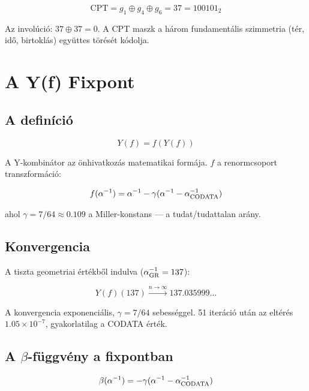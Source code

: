 \documentclass[11pt,a4paper,twoside]{book}
\begin{document}
\begin{equation}
\text{CPT} = g_1 \oplus g_4 \oplus g_6 = 37 = 100101_2
\end{equation}

Az involúció: $37 \oplus 37 = 0$. A CPT maszk a három fundamentális szimmetria (tér, idő, birtoklás) együttes törését kódolja.

\chapter{A Y(f) Fixpont}

\section{A definíció}

\begin{equation}
Y(f) = f(Y(f))
\end{equation}

A Y-kombinátor az önhivatkozás matematikai formája. $f$ a renormcsoport transzformáció:

\begin{equation}
f(\alpha^{-1}) = \alpha^{-1} - \gamma(\alpha^{-1} - \alpha^{-1}_{\rm CODATA})
\end{equation}

ahol $\gamma = 7/64 \approx 0.109$ a Miller-konstans — a tudat/tudattalan arány.

\section{Konvergencia}

A tiszta geometriai értékből indulva ($\alpha^{-1}_{\rm GR} = 137$):

\begin{equation}
Y(f)(137) \xrightarrow{n \to \infty} 137.035999\ldots
\end{equation}

A konvergencia exponenciális, $\gamma = 7/64$ sebességgel. 51 iteráció után az eltérés $1.05 \times 10^{-7}$, gyakorlatilag a CODATA érték.

\section{A $\beta$-függvény a fixpontban}

\begin{equation}
\beta(\alpha^{-1}) = -\gamma(\alpha^{-1} - \alpha^{-1}_{\rm CODATA})
\end{equation}
\end{document}
